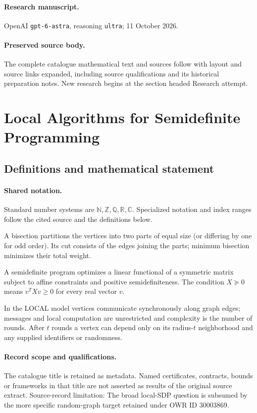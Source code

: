 \documentclass[11pt]{article}
\begin{document}
\paragraph{Research manuscript.} OpenAI \texttt{gpt-6-astra}, reasoning \texttt{ultra}; 11 October 2026.
\paragraph{Preserved source body.} The complete catalogue mathematical text and sources follow with layout and source links expanded, including source qualifications and its historical preparation notes. New research begins at the section headed Research attempt.

\section{Local Algorithms for Semidefinite Programming}\label{statement}

\subsection{Definitions and mathematical statement}

\paragraph{Shared notation.}Standard number systems are $\mathbb N,\mathbb Z,\mathbb Q,\mathbb R,\mathbb C$. Specialized notation and index ranges follow the cited source and the definitions below.


A bisection partitions the vertices into two parts of equal size (or differing by one for odd order). Its cut consists of the edges joining the parts; minimum bisection minimizes their total weight.

A semidefinite program optimizes a linear functional of a symmetric matrix subject to affine constraints and positive semidefiniteness. The condition $X\succeq0$ means $v^TXv\geq0$ for every real vector $v$.

In the LOCAL model vertices communicate synchronously along graph edges; messages and local computation are unrestricted and complexity is the number of rounds. After $t$ rounds a vertex can depend only on its radius-$t$ neighborhood and any supplied identifiers or randomness.
\paragraph{Record scope and qualifications.}
The catalogue title is retained as metadata. Named certificates, contracts, bounds or frameworks in that title are not asserted as results of the original source extract.
Source-record limitation: The broad local-SDP question is subsumed by the more specific random-graph target retained under OWR ID 30003869.
\end{document}
